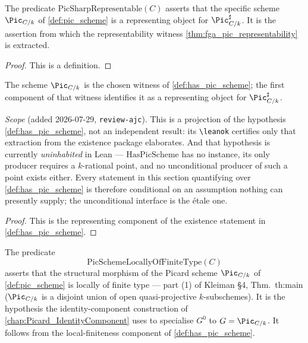 \begin{definition}\leanok
  \label{def:pic_sharp_representable}
  The predicate \(\mathrm{PicSharpRepresentable}(C)\) asserts that the specific scheme
  \(\Pic_{C/k}\) of \cref{def:pic_scheme} is a representing object for
  \(\Pic^\sharp_{C/k}\). It is the assertion from which the representability
  witness \cref{thm:fga_pic_representability} is extracted.
\end{definition}

\begin{proof}
  This is a definition.
\end{proof}

\begin{definition}\leanok
  \label{def:inst_pic_sharp_representable}
  The scheme \(\Pic_{C/k}\) is the chosen witness of
  \cref{def:has_pic_scheme}; the first component of that witness identifies
  it as a representing object for \(\Pic^\sharp_{C/k}\).

  \emph{Scope} (added 2026-07-29, \texttt{review-ajc}). This is a projection of
  the hypothesis \cref{def:has_pic_scheme}, not an independent result: its
  \texttt{\textbackslash leanok} certifies only that extraction from the
  existence package elaborates. And that hypothesis is currently
  \emph{uninhabited} in Lean --- \(\mathrm{HasPicScheme}\) has no instance, its
  only producer requires a \(k\)-rational point, and no unconditional producer of
  such a point exists either. Every statement in this section quantifying over
  \cref{def:has_pic_scheme} is therefore conditional on an assumption nothing
  can presently supply; the unconditional interface is the \'etale one.
\end{definition}

\begin{proof}\leanok
  This is the representing component of the existence statement in
  \cref{def:has_pic_scheme}.
\end{proof}

\begin{definition}\leanok
  \label{def:pic_scheme_lft}
  The predicate
  \[
    \mathrm{PicSchemeLocallyOfFiniteType}(C)
  \]
  asserts that the
  structural morphism of the Picard scheme \(\Pic_{C/k}\) of
  \cref{def:pic_scheme} is locally of finite type --- part (1) of Kleiman
  \S 4, Thm.~th:main (\(\Pic_{C/k}\) is a disjoint union of open
  quasi-projective \(k\)-subschemes). It is the hypothesis the
  identity-component construction of
  \cref{chap:Picard_IdentityComponent} uses to specialise
  \(G^0\) to \(G = \Pic_{C/k}\). It follows from the local-finiteness
  component of \cref{def:has_pic_scheme}.
\end{definition}

